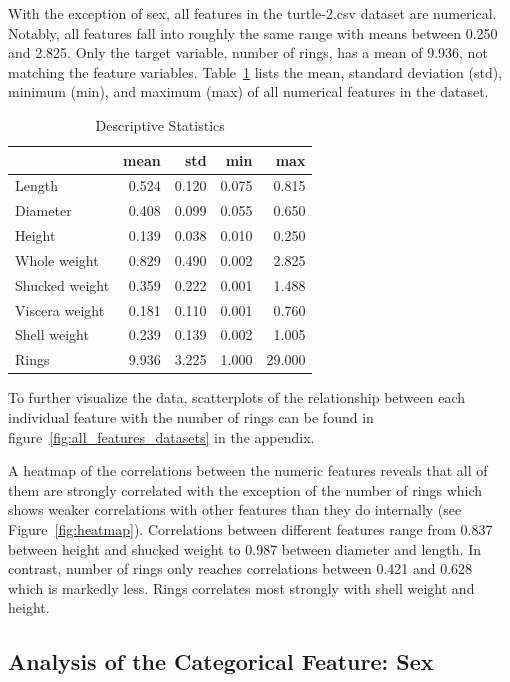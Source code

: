 \documentclass[twocolumn]{article}
\begin{document}
With the exception of sex, all features in the turtle-2.csv dataset are numerical. Notably, all features fall into roughly the same range with means between 0.250 and 2.825. Only the target variable, number of rings, has a mean of 9.936, not matching the feature variables. Table~\ref{tab:desc_stats} lists the mean, standard deviation (std), minimum (min), and maximum (max) of all numerical features in the dataset.
\begin{table}[t]
    \caption{Descriptive Statistics}
    \label{tab:desc_stats}
    \begin{tabular}{lrrrr}
    \toprule
     & mean & std & min & max \\
    \midrule
 Length & 0.524 & 0.120 & 0.075 & 0.815 \\
 Diameter & 0.408 & 0.099 & 0.055 & 0.650 \\
 Height & 0.139 & 0.038 & 0.010 & 0.250 \\
 Whole weight & 0.829 & 0.490 & 0.002 & 2.825 \\
 Shucked weight & 0.359 & 0.222 & 0.001 & 1.488 \\
 Viscera weight & 0.181 & 0.110 & 0.001 & 0.760 \\
 Shell weight & 0.239 & 0.139 & 0.002 & 1.005 \\
 Rings & 9.936 & 3.225 & 1.000 & 29.000 \\
    \bottomrule
    \end{tabular}
\end{table}
To further visualize the data, scatterplots of the relationship between each individual feature with the number of rings can be found in figure~\ref{fig:all_features_datasets} in the appendix.

A heatmap of the correlations between the numeric features reveals that all of them are strongly correlated with the exception of the number of rings which shows weaker correlations with other features than they do internally (see Figure~\ref{fig:heatmap}). 
Correlations between different features range from 0.837 between height and shucked weight to 0.987 between diameter and length. 
In contrast, number of rings only reaches correlations between 0.421 and 0.628 which is markedly less. Rings correlates most strongly with shell weight and height.

\subsection{Analysis of the Categorical Feature: Sex}
\end{document}

